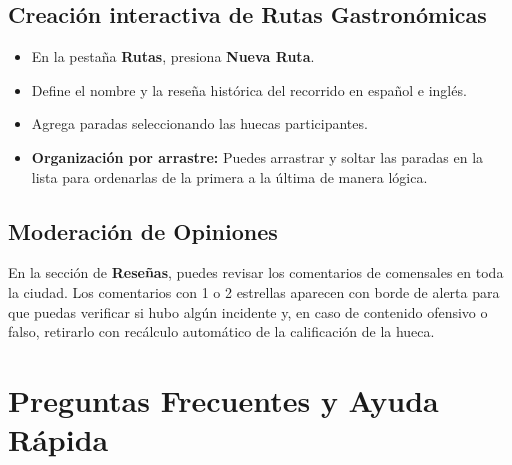 \documentclass[11pt, a4paper, oneside]{article}
\begin{document}
\subsection{Creación interactiva de Rutas Gastronómicas}
\begin{itemize}
  \item En la pestaña \textbf{Rutas}, presiona \textbf{Nueva Ruta}.
  \item Define el nombre y la reseña histórica del recorrido en español e inglés.
  \item Agrega paradas seleccionando las huecas participantes.
  \item \textbf{Organización por arrastre:} Puedes arrastrar y soltar las paradas en la lista para ordenarlas de la primera a la última de manera lógica.
\end{itemize}

\subsection{Moderación de Opiniones}
En la sección de \textbf{Reseñas}, puedes revisar los comentarios de comensales en toda la ciudad. Los comentarios con 1 o 2 estrellas aparecen con borde de alerta para que puedas verificar si hubo algún incidente y, en caso de contenido ofensivo o falso, retirarlo con recálculo automático de la calificación de la hueca.

\section{Preguntas Frecuentes y Ayuda Rápida}
\end{document}

